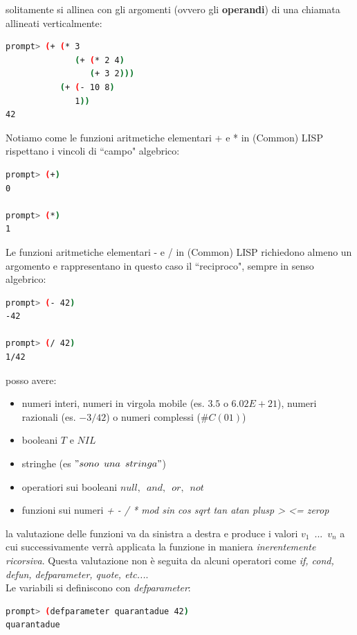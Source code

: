 \documentclass[a4paper,12pt, oneside]{book}
\begin{document}
solitamente si allinea con gli argomenti (ovvero gli \textbf{operandi}) di una chiamata allineati verticalmente:
\begin{shaded}
\begin{lstlisting}[language=bash]
prompt> (+ (* 3
              (+ (* 2 4)
                 (+ 3 2)))
           (+ (- 10 8)
              1))
42
\end{lstlisting}
\end{shaded}
Notiamo come le funzioni aritmetiche elementari + e * in (Common) LISP
rispettano i vincoli di “campo" algebrico:
\begin{shaded}
\begin{lstlisting}[language=bash]
prompt> (+)
0

prompt> (*)
1
\end{lstlisting}
\end{shaded}
Le funzioni aritmetiche elementari - e / in (Common) LISP richiedono almeno
un argomento e rappresentano in questo caso il “reciproco", sempre in senso
algebrico:
\begin{shaded}
\begin{lstlisting}[language=bash]
prompt> (- 42)
-42

prompt> (/ 42)
1/42
\end{lstlisting}
\end{shaded}
posso avere:
\begin{itemize}
\item numeri interi, numeri in virgola mobile (es. $3.5$ o $6.02E+21$), numeri razionali (es. $-3/42$) o numeri complessi ($\#C (0 1)$)
\item booleani $T$ e $NIL$
\item stringhe (es $"sono\,\,\, una \,\,\,stringa"$)
\item operatiori sui booleani $null,\,\,\,and,\,\,\, or,\,\,\,not$
\item funzioni sui numeri \textit{+ - / * mod sin cos sqrt tan atan plusp > <= zerop}
\end{itemize}
la valutazione delle funzioni va da sinistra a destra e produce i valori $v_1\,\,\,...\,\,\, v_n$ a cui successivamente verrà applicata la funzione in maniera \textit{inerentemente ricorsiva}. Questa valutazione non è seguita da alcuni operatori come \textit{if, cond, defun, defparameter, quote, etc...}.\\
Le variabili si definiscono con \textit{defparameter}:
\begin{shaded}
\begin{lstlisting}[language=bash]
prompt> (defparameter quarantadue 42)
quarantadue
\end{lstlisting}
\end{shaded}
\end{document}
